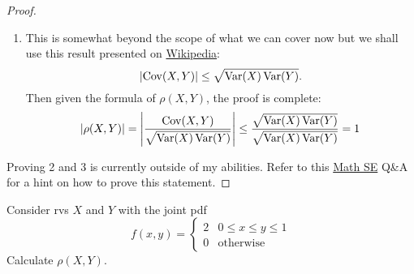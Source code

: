 \documentclass[notoc,notitlepage]{tufte-book}
\begin{document}
\begin{proof}
  \begin{enumerate}
    \item This is somewhat beyond the scope of what we can cover now but we shall use this result presented on \href{https://en.wikipedia.org/wiki/Covariance\#Relationship_to_inner_products}{Wikipedia}:
      \begin{equation*}
        \left| \operatorname{Cov}(X, Y) \right| \leq \sqrt{ \operatorname{Var}(X) \operatorname{Var}(Y) }.
      \end{equation*}
      Then given the formula of $\rho(X, Y)$, the proof is complete:
      \begin{equation*}
        \left| \rho(X, Y) \right| = \left| \frac{\operatorname{Cov}(X, Y)}{\sqrt{ \operatorname{Var}(X) \operatorname{Var}(Y) }} \right| \leq \frac{\sqrt{ \operatorname{Var}(X) \operatorname{Var}(Y) }}{\sqrt{ \operatorname{Var}(X) \operatorname{Var}(Y) }} = 1
      \end{equation*}
  \end{enumerate}
  Proving 2 and 3 is currently outside of my abilities. Refer to this \href{https://math.stackexchange.com/questions/478137/proving-y-ax-b-given-correlation-coefficient-rhox-y-1#478147}{Math SE} Q\&A for a hint on how to prove this statement.
\end{proof}

\begin{eg}[Example 3.20]
  Consider rvs $X$ and $Y$ with the joint pdf
  \begin{equation*}
    f(x, y) = \begin{cases}
      2 & 0 \leq x \leq y \leq 1 \\
      0 & \text{otherwise}
    \end{cases}
  \end{equation*}
  Calculate $\rho(X, Y)$.
\end{eg}
\end{document}
